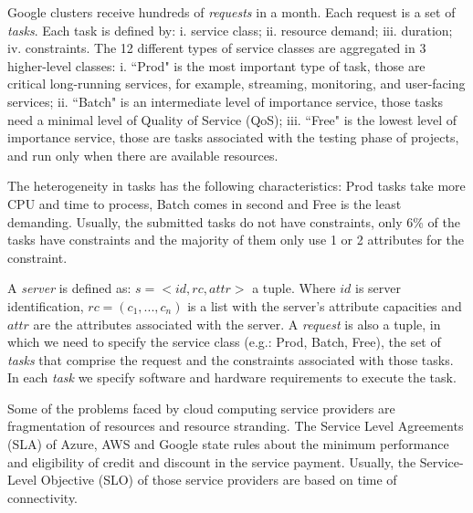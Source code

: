 \documentclass[9pt,a4paper]{article}
\begin{document}
Google clusters receive hundreds of \textit{requests} in a month. Each request is a set of \textit{tasks}. Each task is defined by:
i. service class; ii. resource demand; iii. duration; iv. constraints. The 12 different types of service classes are aggregated in 3 higher-level classes: 
i. ``Prod" is the most important type of task, those are critical long-running services, for example, streaming, monitoring, and user-facing services; 
ii. ``Batch" is an intermediate level of importance service, those tasks need a minimal level of Quality of Service (QoS); 
iii. ``Free" is the lowest level of importance service, those are tasks associated with the testing phase of projects, and run only when there are available resources. 

The heterogeneity in tasks has the following characteristics: Prod tasks take more CPU and time to process, Batch comes in second and Free is the least demanding. Usually, the submitted tasks do not have constraints, only 6\% of the tasks have constraints and the majority of them only use 1 or 2 attributes for the constraint. 

A \textit{server} is defined as: $s=<id,rc,attr>$ a tuple. Where $id$ is server identification, $rc=(c_1,...,c_n)$ is a list with the server's attribute capacities and $attr$ are the attributes associated with the server. A \textit{request} is also a tuple, in which we need to specify the service class (e.g.: Prod, Batch, Free), the set of \textit{tasks} that comprise the request and the constraints associated with those tasks. In each \textit{task} we specify software and hardware requirements to execute the task.

Some of the problems faced by cloud computing service providers are fragmentation of resources and resource stranding. The Service Level Agreements (SLA) of Azure, AWS and Google state rules about the minimum performance and eligibility of credit and discount in the service payment. Usually, the Service-Level Objective (SLO) of those service providers are based on time of connectivity. 
\end{document}
